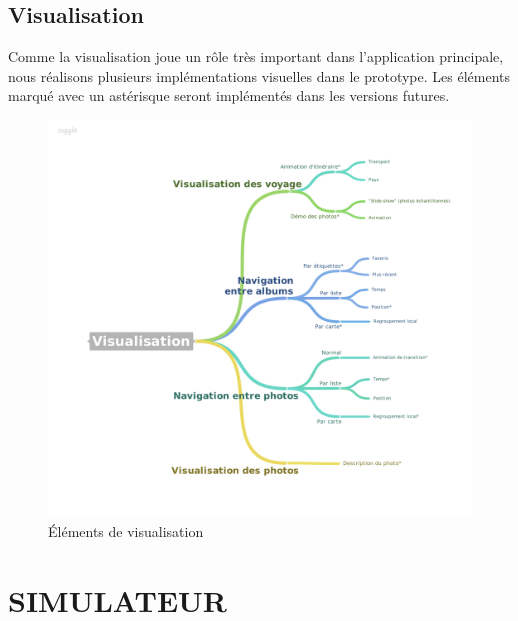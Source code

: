 \documentclass{article}
\begin{document}
\subsection{\Large Visualisation}

Comme la visualisation joue un rôle très important dans l'application principale, nous réalisons plusieurs implémentations visuelles dans le prototype. Les éléments marqué avec un astérisque seront implémentés dans les versions futures.

\begin{figure}[h!]
\centering
\includegraphics[width=160mm]{VISU.pdf}
\caption{Éléments de visualisation}
\end{figure}

\clearpage
\section{\LARGE SIMULATEUR }

\vspace{0.2 cm}
\end{document}
